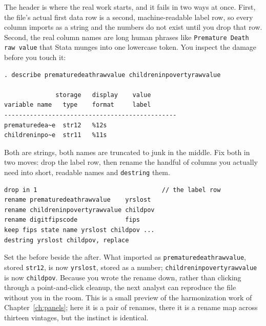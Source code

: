 The header is where the real work starts, and it fails in two ways at once. First, the file's actual first data row is a second, machine-readable label row, so every column imports as a string and the numbers do not exist until you drop that row. Second, the real column names are long human phrases like \texttt{Premature Death raw value} that Stata munges into one lowercase token. You inspect the damage before you touch it:
\par
{\footnotesize
\begin{verbatim}
. describe prematuredeathrawvalue childreninpovertyrawvalue

              storage   display    value
variable name   type    format     label
-----------------------------------------------
prematuredea~e  str12   %12s
childreninpo~e  str11   %11s
\end{verbatim}
}
Both are strings, both names are truncated to junk in the middle. Fix both in two moves: drop the label row, then rename the handful of columns you actually need into short, readable names and \texttt{destring} them.
\par
{\footnotesize
\begin{verbatim}
drop in 1                                  // the label row
rename prematuredeathrawvalue    yrslost
rename childreninpovertyrawvalue childpov
rename digitfipscode             fips
keep fips state name yrslost childpov ...
destring yrslost childpov, replace
\end{verbatim}
}
Set the before beside the after. What imported as \texttt{premature\allowbreak death\allowbreak raw\allowbreak value}, stored \texttt{str12}, is now \texttt{yrslost}, stored as a number; \texttt{childrenin\allowbreak poverty\allowbreak raw\allowbreak value} is now \texttt{childpov}. Because you wrote the rename down, rather than clicking through a point-and-click cleanup, the next analyst can reproduce the file without you in the room. This is a small preview of the harmonization work of Chapter~\ref{ch:panels}; here it is a pair of renames, there it is a rename map across thirteen vintages, but the instinct is identical.

